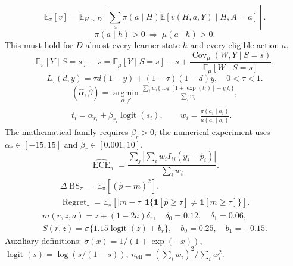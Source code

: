 \documentclass{article}
\begin{document}
\begin{equation}
\mathbb E_\pi[v]=\mathbb E_{H\sim D}\left[
\sum_a\pi(a\mid H)\mathbb E[v(H,a,Y)\mid H,A=a]\right].
\end{equation}
\begin{equation}
\pi(a\mid h)>0\ \Longrightarrow\ \mu(a\mid h)>0.
\end{equation}
This must hold for $D$-almost every learner state $h$ and every eligible action $a$.
\begin{equation}
\mathbb E_\pi[Y\mid S=s]-s=
\mathbb E_\mu[Y\mid S=s]-s+
\frac{\operatorname{Cov}_\mu(W,Y\mid S=s)}{\mathbb E_\mu[W\mid S=s]}.
\end{equation}
\begin{equation}
L_\tau(d,y)=\tau d(1-y)+(1-\tau)(1-d)y,\quad 0<\tau<1.
\end{equation}
\begin{equation}
\begin{gathered}
(\widehat\alpha,\widehat\beta)=\underset{\alpha,\beta}{\operatorname{argmin}}
\frac{\sum_i w_i\{\log[1+\exp(t_i)]-y_it_i\}}{\sum_iw_i},\\
t_i=\alpha_{r_i}+\beta_{r_i}\operatorname{logit}(s_i),\qquad
w_i=\frac{\pi(a_i\mid h_i)}{\mu(a_i\mid h_i)}.
\end{gathered}
\end{equation}
The mathematical family requires $\beta_r>0$; the numerical experiment
uses $\alpha_r\in[-15,15]$ and $\beta_r\in[0.001,10]$.
\begin{equation}
\widehat{\operatorname{ECE}}_\pi=
\frac{\sum_j\left|\sum_iw_iI_{ij}(y_i-\widehat p_i)\right|}{\sum_iw_i}.
\end{equation}
\begin{equation}
\begin{gathered}
\Delta\operatorname{BS}_\pi=\mathbb E_\pi[(\widehat p-m)^2],\\
\operatorname{Regret}_\tau=\mathbb E_\pi\left[
|m-\tau|\,\mathbf 1\{\mathbf 1[\widehat p\ge\tau]\ne\mathbf 1[m\ge\tau]\}\right].
\end{gathered}
\end{equation}
\begin{equation}
\begin{gathered}
m(r,z,a)=z+(1-2a)\delta_r,\quad\delta_0=0.12,\quad\delta_1=0.06,\\
S(r,z)=\sigma\{1.15\operatorname{logit}(z)+b_r\},\quad b_0=0.25,\quad b_1=-0.15.
\end{gathered}
\end{equation}
Auxiliary definitions: $\sigma(x)=1/(1+\exp(-x))$,
$\operatorname{logit}(s)=\log(s/(1-s))$,
$n_{\mathrm{eff}}=(\sum_iw_i)^2/\sum_iw_i^2$.
\end{document}
